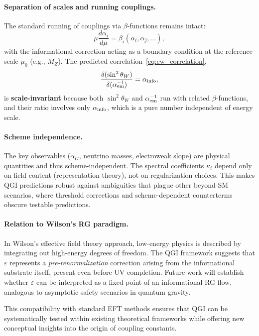 \documentclass{article}
\numberwithin{equation}{section}
\theoremstyle{plain}
\theoremstyle{definition}
\theoremstyle{remark}
\begin{document}
\paragraph{Separation of scales and running couplings.}
The standard running of couplings via $\beta$-functions remains intact:
\begin{equation}
\mu\frac{d\alpha_i}{d\mu} = \beta_i(\alpha_i, \alpha_j,\ldots),
\end{equation}
with the informational correction acting as a boundary condition at the reference scale $\mu_0$ (e.g., $M_Z$). The predicted correlation~\eqref{eq:ew_correlation},
\begin{equation}
\frac{\delta(\sin^2\theta_W)}{\delta(\alpha_{\rm em}^{-1})} = \alpha_{\rm info},
\end{equation}
is \textbf{scale-invariant} because both $\sin^2\theta_W$ and $\alpha_{\rm em}^{-1}$ run with related $\beta$-functions, and their ratio involves only $\alpha_{\rm info}$, which is a pure number independent of energy scale.

\paragraph{Scheme independence.}
The key observables ($\alpha_G$, neutrino masses, electroweak slope) are physical quantities and thus scheme-independent. The spectral coefficients $\kappa_i$ depend only on field content (representation theory), not on regularization choices. This makes QGI predictions robust against ambiguities that plague other beyond-SM scenarios, where threshold corrections and scheme-dependent counterterms obscure testable predictions.

\paragraph{Relation to Wilson's RG paradigm.}
In Wilson's effective field theory approach, low-energy physics is described by integrating out high-energy degrees of freedom. The QGI framework suggests that $\varepsilon$ represents a \emph{pre-renormalization} correction arising from the informational substrate itself, present even before UV completion. Future work will establish whether $\varepsilon$ can be interpreted as a fixed point of an informational RG flow, analogous to asymptotic safety scenarios in quantum gravity.

This compatibility with standard EFT methods ensures that QGI can be systematically tested within existing theoretical frameworks while offering new conceptual insights into the origin of coupling constants.
\end{document}
